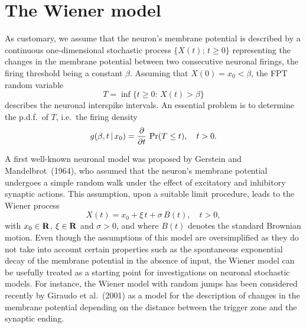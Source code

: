 \section{The Wiener model}\label{section:2}
As customary, we assume that the neuron's membrane potential is described by a
continuous one-dimensional stochastic process $\{X(t);\,t\geq 0\}$ representing the changes
in the membrane potential between two consecutive neuronal firings, the firing threshold
being a constant $\beta$. Assuming that $X(0)=x_0<\beta$, the FPT random variable
$$
 T=\inf\{t\geq 0\colon\,X(t)>\beta\}
$$
describes the neuronal interspike intervals. An essential problem is
to determine the p.d.f.\ of $T$, i.e.\ the firing density
$$
 g(\beta,t\,|\,x_0)={\partial\over\partial t}\,\Pr(T\leq t), \quad t> 0.
$$
\par
A first well-known neuronal model was proposed by Gerstein and Mandelbrot~(1964),
who assumed that the neuron's membrane potential undergoes a simple random 
walk under the effect of excitatory and inhibitory synaptic actions. 
This assumption, upon a suitable limit procedure, leads to the Wiener process 
$$
 X(t)=x_0+\xi\,t+\sigma\,B(t), \quad t> 0,
$$
with $x_0\in{\bf R}$, $\xi\in{\bf R}$ and $\sigma>0$, and
where $B(t)$ denotes  the standard Brownian motion. Even though
the assumptions of this model are  oversimplified as they do
not take into account certain properties such as the
spontaneous  exponential decay of the membrane potential in the
absence of input, the Wiener model  can be usefully treated as
a starting point for investigations on neuronal stochastic
models.  For instance, the Wiener model with random jumps has
been considered recently by  Giraudo et al.\ (2001) as a model
for the description of changes in the membrane  potential
depending on the distance between the trigger zone and the
synaptic ending.
